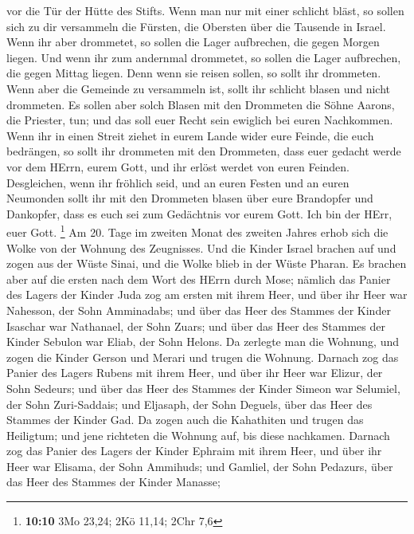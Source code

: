 vor die Tür der Hütte des Stifts.  Wenn man nur mit einer
schlicht bläst, so sollen sich zu dir versammeln die Fürsten, die
Obersten über die Tausende in Israel.  Wenn ihr aber
drommetet, so sollen die Lager aufbrechen, die gegen Morgen liegen.
 Und wenn ihr zum andernmal drommetet, so sollen die Lager
aufbrechen, die gegen Mittag liegen. Denn wenn sie reisen sollen, so
sollt ihr drommeten.  Wenn aber die Gemeinde zu versammeln
ist, sollt ihr schlicht blasen und nicht drommeten.  Es
sollen aber solch Blasen mit den Drommeten die Söhne Aarons, die
Priester, tun; und das soll euer Recht sein ewiglich bei euren
Nachkommen.  Wenn ihr in einen Streit ziehet in eurem Lande
wider eure Feinde, die euch bedrängen, so sollt ihr drommeten mit den
Drommeten, dass euer gedacht werde vor dem HErrn, eurem Gott, und ihr
erlöst werdet von euren Feinden.  Desgleichen, wenn ihr
fröhlich seid, und an euren Festen und an euren Neumonden sollt ihr mit
den Drommeten blasen über eure Brandopfer und Dankopfer, dass es euch
sei zum Gedächtnis vor eurem Gott. Ich bin der HErr, euer Gott.
\footnote{\textbf{10:10} 3Mo 23,24; 2Kö 11,14; 2Chr 7,6} 
Am 20. Tage im zweiten Monat des zweiten Jahres erhob sich die Wolke von
der Wohnung des Zeugnisses.  Und die Kinder Israel brachen
auf und zogen aus der Wüste Sinai, und die Wolke blieb in der Wüste
Pharan.  Es brachen aber auf die ersten nach dem Wort des
HErrn durch Mose;  nämlich das Panier des Lagers der Kinder
Juda zog am ersten mit ihrem Heer, und über ihr Heer war Nahesson, der
Sohn Amminadabs;  und über das Heer des Stammes der Kinder
Isaschar war Nathanael, der Sohn Zuars;  und über das Heer
des Stammes der Kinder Sebulon war Eliab, der Sohn Helons. 
Da zerlegte man die Wohnung, und zogen die Kinder Gerson und Merari und
trugen die Wohnung.  Darnach zog das Panier des Lagers
Rubens mit ihrem Heer, und über ihr Heer war Elizur, der Sohn Sedeurs;
 und über das Heer des Stammes der Kinder Simeon war
Selumiel, der Sohn Zuri-Saddais;  und Eljasaph, der Sohn
Deguels, über das Heer des Stammes der Kinder Gad.  Da
zogen auch die Kahathiten und trugen das Heiligtum; und jene richteten
die Wohnung auf, bis diese nachkamen.  Darnach zog das
Panier des Lagers der Kinder Ephraim mit ihrem Heer, und über ihr Heer
war Elisama, der Sohn Ammihuds;  und Gamliel, der Sohn
Pedazurs, über das Heer des Stammes der Kinder Manasse; 
